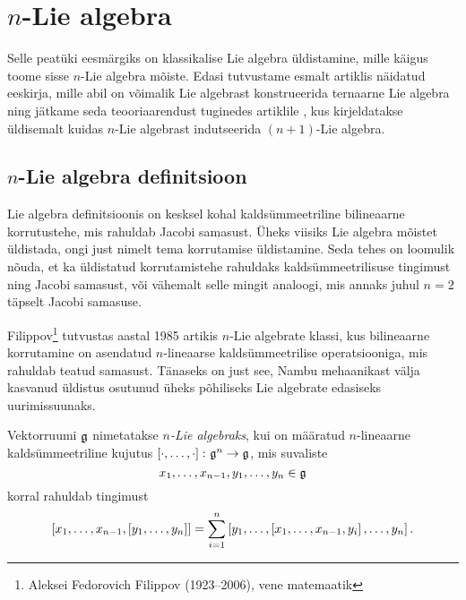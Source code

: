 

\section{\texorpdfstring{$n$}{n}-Lie algebra}

Selle peatüki eesmärgiks on klassikalise Lie algebra
üldistamine, mille käigus toome sisse $n$-Lie algebra mõiste.
Edasi tutvustame esmalt artiklis \cite{AMS:2011} näidatud eeskirja,
mille abil on võimalik Lie algebrast konstrueerida
ternaarne Lie algebra ning jätkame seda teooriaarendust
tuginedes artiklile \cite{AKMS:2014}, kus kirjeldatakse
üldisemalt kuidas $n$-Lie algebrast indutseerida $(n+1)$-Lie
algebra.

\subsection{\texorpdfstring{$n$}{n}-Lie algebra definitsioon}

Lie algebra definitsioonis on kesksel kohal kaldsümmeetriline
bilineaarne korrutustehe, mis rahuldab Jacobi samasust.
Üheks viisiks Lie algebra mõistet üldistada, ongi just nimelt
tema korrutamise üldistamine. Seda tehes on loomulik nõuda, et
ka üldistatud korrutamistehe rahuldaks kaldsümmeetrilisuse
tingimust ning Jacobi samasust, või vähemalt selle mingit
analoogi, mis annaks juhul $n=2$ täpselt Jacobi samasuse.

Filippov\footnote{Aleksei Fedorovich Filippov (1923--2006),
vene matemaatik} tutvustas aastal 1985 artikis \cite{filippov1985}
$n$-Lie algebrate klassi, kus bilineaarne korrutamine on
asendatud $n$-lineaarse kaldsümmeetrilise operatsiooniga,
mis rahuldab teatud samasust. \cite{kasymov1987}
Tänaseks on just see, Nambu mehaanikast välja kasvanud
üldistus osutunud üheks põhiliseks Lie algebrate edasiseks
uurimissuunaks.

\begin{dfn}
    Vektorruumi $\mathfrak{g}$ nimetatakse \emph{$n$-Lie algebraks}, kui
    on määratud $n$-lineaarne kaldsümmeetriline kujutus
    $\left[ \cdot, \dots, \cdot \right] \colon \mathfrak{g}^n \to \mathfrak{g}$, mis
    suvaliste
    \[ x_1, \dots, x_{n-1}, y_1, \dots, y_n \in \mathfrak{g} \]
    korral rahuldab tingimust
    \begin{align}\label{id:filippov}
        \left[ x_1, \dots, x_{n-1}, \left[ y_1, \dots, y_n \right] \right] =
        \sum_{i=1}^n \left[
            y_1, \dots, \left[ x_1, \dots, x_{n-1}, y_i \right], \dots, y_n
        \right].
    \end{align}
\end{dfn}

